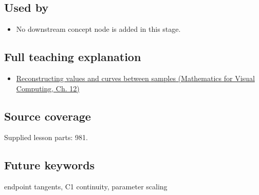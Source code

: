 \subsection{Used by}\label{appendix-db3aef8f2fd6-used-by}

\hypertarget{appendix-db3aef8f2fd6-used-by}{}

\begin{itemize}
\tightlist
\item
  No downstream concept node is added in this stage.
\end{itemize}

\subsection{Full teaching explanation}\label{appendix-db3aef8f2fd6-full-teaching-explanation}

\hypertarget{appendix-db3aef8f2fd6-full-teaching-explanation}{}

\begin{itemize}
\tightlist
\item
  \href{../02-Mathematics-for-Visual-Computing/main.pdf\#nameddest=02-foundations-ii-ch028-reconstructing-values-and-curves-between-samples}{Reconstructing values and curves between samples (Mathematics for Visual Computing, Ch. 12)}
\end{itemize}

\subsection{Source coverage}\label{appendix-db3aef8f2fd6-source-coverage}

\hypertarget{appendix-db3aef8f2fd6-source-coverage}{}

Supplied lesson parts: 981.

\subsection{Future keywords}\label{appendix-db3aef8f2fd6-future-keywords}

\hypertarget{appendix-db3aef8f2fd6-future-keywords}{}

endpoint tangents, C1 continuity, parameter scaling
